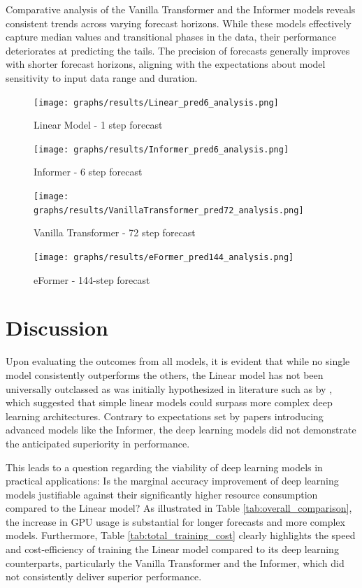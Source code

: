 \documentclass{article}
\begin{document}
Comparative analysis of the Vanilla Transformer and the Informer models reveals consistent trends across varying forecast horizons. While these models effectively capture median values and transitional phases in the data, their performance deteriorates at predicting the tails. The precision of forecasts generally improves with shorter forecast horizons, aligning with the expectations about model sensitivity to input data range and duration.

\begin{figure}
    \centering
    \texttt{[image: graphs/results/Linear\_pred6\_analysis.png]}
    \caption{Linear Model - 1 step forecast}
    \label{fig:Linear_f1}
\end{figure}

\begin{figure}
    \centering
    \texttt{[image: graphs/results/Informer\_pred6\_analysis.png]}
    \caption{Informer - 6 step forecast}
    \label{fig:vanillatransformer_f6_emb32}
\end{figure}

\begin{figure}
    \centering
    \texttt{[image: graphs/results/VanillaTransformer\_pred72\_analysis.png]}
    \caption{Vanilla Transformer - 72 step forecast}
    \label{fig:vanillatransformer_f72_emb64}
\end{figure}

\begin{figure}
    \centering
    \texttt{[image: graphs/results/eFormer\_pred144\_analysis.png]}
    \caption{eFormer - 144-step forecast}
    \label{fig:eFormer_f144_emb32}
\end{figure}

\section{Discussion}

Upon evaluating the outcomes from all models, it is evident that while no single model consistently outperforms the others, the Linear model has not been universally outclassed as was initially hypothesized in literature such as by \cite{transformers-effectiveness}, which suggested that simple linear models could surpass more complex deep learning architectures. Contrary to expectations set by papers introducing advanced models like the Informer, the deep learning models did not demonstrate the anticipated superiority in performance.

This leads to a question regarding the viability of deep learning models in practical applications: Is the marginal accuracy improvement of deep learning models justifiable against their significantly higher resource consumption compared to the Linear model? As illustrated in Table \ref{tab:overall_comparison}, the increase in GPU usage is substantial for longer forecasts and more complex models. Furthermore, Table \ref{tab:total_training_cost} clearly highlights the speed and cost-efficiency of training the Linear model compared to its deep learning counterparts, particularly the Vanilla Transformer and the Informer, which did not consistently deliver superior performance.
\end{document}
